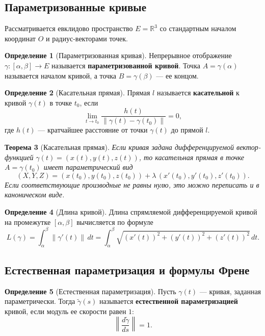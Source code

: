 \documentclass[12pt,a4paper]{article}
\newtheorem{theorem}{Теорема}[section]
\theoremstyle{definition}
\newtheorem{definition}[theorem]{Определение}
\begin{document}
\subsection{Параметризованные кривые}

Рассматривается евклидово пространство $E = \mathbb{R}^3$ со стандартным началом координат $O$ и радиус-векторами точек.

\begin{definition}[Параметризованная кривая]
Непрерывное отображение $\gamma: [\alpha, \beta] \to E$ называется \textbf{параметризованной кривой}. Точка $A = \gamma(\alpha)$ называется началом кривой, а точка $B = \gamma(\beta)$ --- ее концом.
\end{definition}

\begin{definition}[Касательная прямая]
Прямая $l$ называется \textbf{касательной} к кривой $\gamma(t)$ в точке $t_0$, если
$$\lim_{t \to t_0} \frac{h(t)}{\|\gamma(t) - \gamma(t_0)\|} = 0,$$
где $h(t)$ --- кратчайшее расстояние от точки $\gamma(t)$ до прямой $l$.
\end{definition}

\begin{theorem}[Касательная прямая]
Если кривая задана дифференцируемой вектор-функцией
$\gamma(t) = (x(t), y(t), z(t))$, то касательная прямая
в точке $A = \gamma(t_0)$ имеет параметрический вид
$$
(X, Y, Z) = (x(t_0), y(t_0), z(t_0)) + \lambda\,(x'(t_0), y'(t_0), z'(t_0)).
$$
Если соответствующие производные не равны нулю, это можно переписать и в каноническом виде.
\end{theorem}

\begin{definition}[Длина кривой]
Длина спрямляемой дифференцируемой кривой на промежутке $[\alpha, \beta]$ вычисляется по формуле
$$L(\gamma) = \int_{\alpha}^{\beta} \|\gamma'(t)\|\,dt = \int_{\alpha}^{\beta} \sqrt{(x'(t))^2 + (y'(t))^2 + (z'(t))^2}\,dt.$$
\end{definition}

\subsection{Естественная параметризация и формулы Френе}

\begin{definition}[Естественная параметризация]
Пусть $\gamma(t)$ --- кривая, заданная параметрически. Тогда $\tilde{\gamma}(s)$ называется \textbf{естественной параметризацией} кривой, если модуль ее скорости равен $1$:
$$\left\| \frac{d\tilde{\gamma}}{ds} \right\| = 1.$$
\end{definition}
\end{document}
